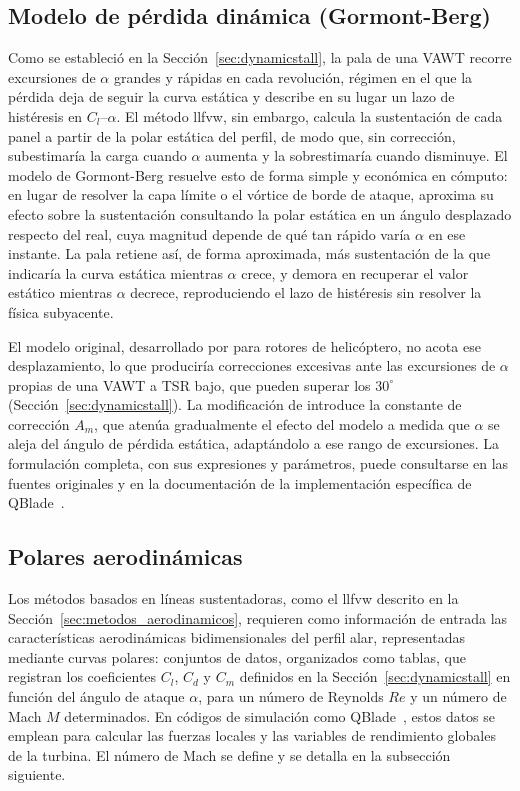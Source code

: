 \subsection{Modelo de pérdida dinámica (Gormont-Berg)}

Como se estableció en la Sección~\ref{sec:dynamicstall}, la pala de una VAWT recorre excursiones de $\alpha$ grandes y rápidas en cada revolución, régimen en el que la pérdida deja de seguir la curva estática y describe en su lugar un lazo de histéresis en $C_l$--$\alpha$. El método \gls{llfvw}, sin embargo, calcula la sustentación de cada panel a partir de la polar estática del perfil, de modo que, sin corrección, subestimaría la carga cuando $\alpha$ aumenta y la sobrestimaría cuando disminuye. El modelo de Gormont-Berg resuelve esto de forma simple y económica en cómputo: en lugar de resolver la capa límite o el vórtice de borde de ataque, aproxima su efecto sobre la sustentación consultando la polar estática en un ángulo desplazado respecto del real, cuya magnitud depende de qué tan rápido varía $\alpha$ en ese instante. La pala retiene así, de forma aproximada, más sustentación de la que indicaría la curva estática mientras $\alpha$ crece, y demora en recuperar el valor estático mientras $\alpha$ decrece, reproduciendo el lazo de histéresis sin resolver la física subyacente.

El modelo original, desarrollado por \textcite{Gormont1973} para rotores de helicóptero, no acota ese desplazamiento, lo que produciría correcciones excesivas ante las excursiones de $\alpha$ propias de una VAWT a TSR bajo, que pueden superar los $30^\circ$ (Sección~\ref{sec:dynamicstall}). La modificación de \textcite{Berg1983} introduce la constante de corrección $A_m$, que atenúa gradualmente el efecto del modelo a medida que $\alpha$ se aleja del ángulo de pérdida estática, adaptándolo a ese rango de excursiones. La formulación completa, con sus expresiones y parámetros, puede consultarse en las fuentes originales y en la documentación de la implementación específica de QBlade~\parencite{Gormont1973,Berg1983,QBladeDocsGormont2024}.

\subsection{Polares aerodinámicas}
\label{sec:polares}

Los métodos basados en líneas sustentadoras, como el \gls{llfvw} descrito en la Sección~\ref{sec:metodos_aerodinamicos}, requieren como información de entrada las características aerodinámicas bidimensionales del perfil alar, representadas mediante curvas polares: conjuntos de datos, organizados como tablas, que registran los coeficientes $C_l$, $C_d$ y $C_m$ definidos en la Sección~\ref{sec:dynamicstall} en función del ángulo de ataque $\alpha$, para un número de Reynolds $Re$ y un número de Mach $M$ determinados. En códigos de simulación como QBlade~\parencite{marten2019qblade}, estos datos se emplean para calcular las fuerzas locales y las variables de rendimiento globales de la turbina. El número de Mach se define y se detalla en la subsección siguiente.

